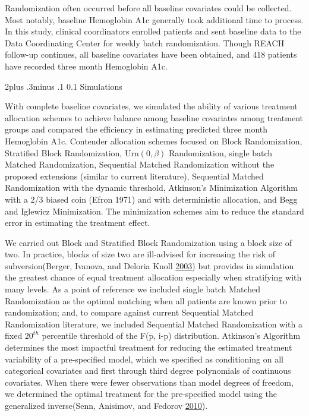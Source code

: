 \documentclass[12pt,oneside]{book}
\makeatletter
\newlength{\li}\setlength{\li}{14.48pt}
\newlength{\di}\setlength{\di}{-3.5mm}
\renewcommand\subsection{\@startsection {subsection}{2}{\z@}%
    {2\@bls  plus .3\@bls minus .1\@bls}%
    {0.1\@bls}%
    {\noindent\normalfont}}
\theoremstyle{definition}
\theoremstyle{definition}
\theoremstyle{definition}
\theoremstyle{remark}
\makeatother
\begin{document}
Randomization often occurred before all baseline covariates could be
collected. Most notably, baseline Hemoglobin A1c generally took
additional time to process. In this study, clinical coordinators
enrolled patients and sent baseline data to the Data Coordinating Center
for weekly batch randomization. Though REACH follow-up continues, all
baseline covariates have been obtained, and 418 patients have recorded
three month Hemoglobin A1c.

\hypertarget{simulations}{%
\subsection{Simulations}\label{simulations}}

With complete baseline covariates, we simulated the ability of various
treatment allocation schemes to achieve balance among baseline
covariates among treatment groups and compared the efficiency in
estimating predicted three month Hemoglobin A1c. Contender allocation
schemes focused on Block Randomization, Stratified Block Randomization,
Urn\((0,\beta)\) Randomization, single batch Matched Randomization,
Sequential Matched Randomization without the proposed extensions
(similar to current literature), Sequential Matched Randomization with
the dynamic threshold, Atkinson's Minimization Algorithm with a 2/3
biased coin (Efron 1971) and with deterministic allocation, and Begg and
Iglewicz Minimization. The minimization schemes aim to reduce the
standard error in estimating the treatment effect.

We carried out Block and Stratified Block Randomization using a block
size of two. In practice, blocks of size two are ill-advised for
increasing the risk of subversion(Berger, Ivanova, and Deloria Knoll
\protect\hyperlink{ref-Berger:2003im}{2003}) but provides in simulation
the greatest chance of equal treatment allocation especially when
stratifying with many levels. As a point of reference we included single
batch Matched Randomization as the optimal matching when all patients
are known prior to randomization; and, to compare against current
Sequential Matched Randomization literature, we included Sequential
Matched Randomization with a fixed \(20^{th}\) percentile threshold of
the F(p, i-p) distribution. Atkinson's Algorithm determines the most
impactful treatment for reducing the estimated treatment variability of
a pre-specified model, which we specified as conditioning on all
categorical covariates and first through third degree polynomials of
continuous covariates. When there were fewer observations than model
degrees of freedom, we determined the optimal treatment for the
pre-specified model using the generalized inverse(Senn, Anisimov, and
Fedorov \protect\hyperlink{ref-Senn:2010bg}{2010}).
\end{document}
